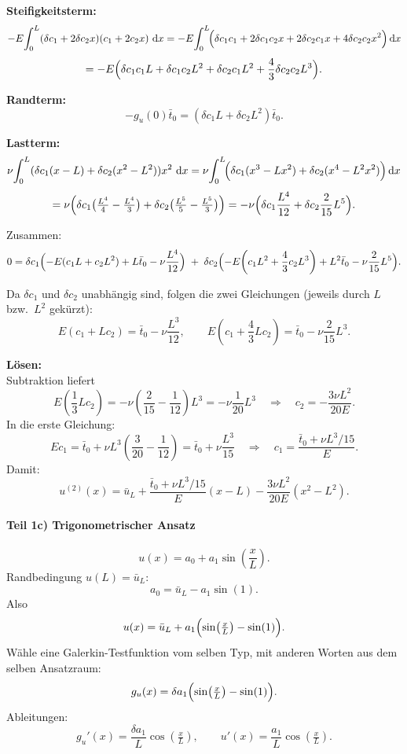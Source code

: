 \documentclass[12pt,a4paper]{article}
\newcommand{\dd}{\,\mathrm d}
\begin{document}
\textbf{Steifigkeitsterm:}
\[
-E\!\int_0^L(\delta c_1+2\delta c_2x)(c_1+2c_2x)\,\dd x
=-E\!\int_0^L\!\Bigl(\delta c_1c_1+2\delta c_1c_2x+2\delta c_2c_1x+4\delta c_2c_2x^2\Bigr)\dd x
\]
\[
=-E\Bigl(\delta c_1c_1L+\delta c_1c_2L^2+\delta c_2c_1L^2+\frac{4}{3}\delta c_2c_2L^3\Bigr).
\]

\textbf{Randterm:}
\[
-g_u(0)\bar t_0=(\delta c_1L+\delta c_2L^2)\bar t_0.
\]

\textbf{Lastterm:}
\[
\nu\!\int_0^L(\delta c_1(x-L)+\delta c_2(x^2-L^2))x^2\,\dd x
=\nu\!\int_0^L\!\Bigl(\delta c_1(x^3-Lx^2)+\delta c_2(x^4-L^2x^2)\Bigr)\dd x
\]
\[
=\nu\Bigl(\delta c_1\bigl(\tfrac{L^4}{4}-\tfrac{L^4}{3}\bigr)
  +\delta c_2\bigl(\tfrac{L^5}{5}-\tfrac{L^5}{3}\bigr)\Bigr)
=-\nu\Bigl(\delta c_1\frac{L^4}{12}+\delta c_2\frac{2}{15}L^5\Bigr).
\]

Zusammen:
\[
0=\delta c_1\Bigl(-E(c_1L+c_2L^2)+L\bar t_0-\nu\frac{L^4}{12}\Bigr)
\;+\;\delta c_2\Bigl(-E\!\left(c_1L^2+\frac{4}{3}c_2L^3\right)+L^2\bar t_0-\nu\frac{2}{15}L^5\Bigr).
\]

Da $\delta c_1$ und $\delta c_2$ unabhängig sind, folgen die zwei Gleichungen (jeweils durch $L$ bzw.\ $L^2$ gekürzt):
\[
E(c_1+Lc_2)=\bar t_0-\nu\frac{L^3}{12},\qquad
E\!\left(c_1+\frac{4}{3}Lc_2\right)=\bar t_0-\nu\frac{2}{15}L^3.
\]

\medskip
\textbf{Lösen:}\\
Subtraktion liefert
\[
E\left(\frac{1}{3}Lc_2\right)
=-\nu\left(\frac{2}{15}-\frac{1}{12}\right)L^3
=-\nu\frac{1}{20}L^3
\quad\Rightarrow\quad
\boxed{c_2=-\frac{3\nu L^2}{20E}}.
\]
In die erste Gleichung:
\[
E c_1=\bar t_0+\nu L^3\left(\frac{3}{20}-\frac{1}{12}\right)
=\bar t_0+\nu\frac{L^3}{15}
\quad\Rightarrow\quad
\boxed{c_1=\frac{\bar t_0+\nu L^3/15}{E}}.
\]
Damit:
\[
\boxed{
u^{(2)}(x)=\bar u_L+\frac{\bar t_0+\nu L^3/15}{E}(x-L)
-\frac{3\nu L^2}{20E}(x^2-L^2)
}.
\]

\paragraph{Teil 1c) Trigonometrischer Ansatz}

\[
u(x)=a_0+a_1\sin\!\left(\frac{x}{L}\right).
\]
Randbedingung $u(L)=\bar u_L$:
\[
a_0=\bar u_L-a_1\sin(1).
\]
Also
\[
u(x)=\bar u_L+a_1\Bigl(\sin\!\left(\tfrac{x}{L}\right)-\sin(1)\Bigr).
\]
Wähle eine Galerkin-Testfunktion vom selben Typ, mit anderen Worten aus dem selben Ansatzraum:
\[
g_u(x)=\delta a_1\Bigl(\sin\!\left(\tfrac{x}{L}\right)-\sin(1)\Bigr).
\]
Ableitungen:
\[
g_u'(x)=\frac{\delta a_1}{L}\cos\!\left(\tfrac{x}{L}\right),
\qquad
u'(x)=\frac{a_1}{L}\cos\!\left(\tfrac{x}{L}\right).
\]
\end{document}
